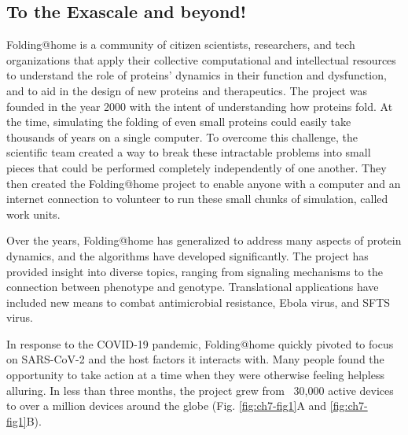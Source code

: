 \documentclass[../main.tex]{subfiles}
\begin{document}
    \subsection{To the Exascale and beyond!}
        Folding@home is a community of citizen scientists, researchers, and tech organizations that apply their collective computational and intellectual resources to understand the role of proteins’ dynamics in their function and dysfunction, and to aid in the design of new proteins and therapeutics. The project was founded in the year 2000 with the intent of understanding how proteins fold. At the time, simulating the folding of even small proteins could easily take thousands of years on a single computer. To overcome this challenge, the scientific team created a way to break these intractable problems into small pieces that could be performed completely independently of one another. They then created the Folding@home project to enable anyone with a computer and an internet connection to volunteer to run these small chunks of simulation, called work units.

        Over the years, Folding@home has generalized to address many aspects of protein dynamics, and the algorithms have developed significantly. The project has provided insight into diverse topics, ranging from signaling mechanisms\cite{Kohlhoff:2014bo,Shukla:2014jp,Sun:2018kx} to the connection between phenotype and genotype\cite{Hart:2016kb,chen_dynamic_2019,porter_conformational_2020}. Translational applications have included new means to combat antimicrobial resistance, Ebola virus, and SFTS virus\cite{Porter:2019hv,hart_designing_2017,Cruz2020vp35,wang_cap-snatching_2020}.

        In response to the COVID-19 pandemic, Folding@home quickly pivoted to focus on SARS-CoV-2 and the host factors it interacts with. Many people found the opportunity to take action at a time when they were otherwise feeling helpless alluring. In less than three months, the project grew from ~30,000 active devices to over a million devices around the globe (Fig. \ref{fig:ch7-fig1}A and \ref{fig:ch7-fig1}B).
\end{document}
